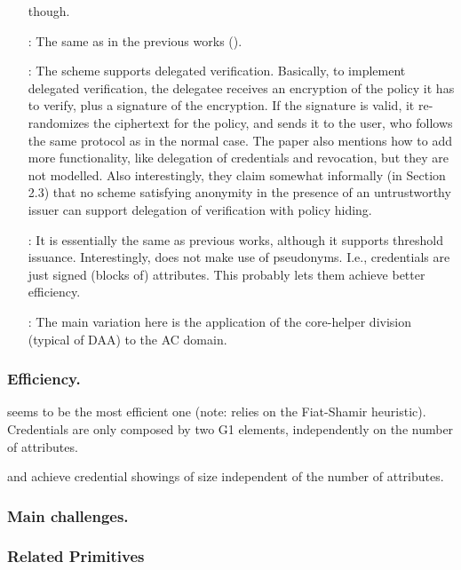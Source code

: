 \begin{enumerate}
  though.
\item[\cite{cdhk15}:] The same as in the previous works (\cite{cl01,cl02,cl04}).
\item[\cite{dmm+18}:] The scheme supports delegated verification. Basically,
  to implement delegated verification, the delegatee receives an encryption of
  the policy it has to verify, plus a signature of the encryption. If the
  signature is valid, it re-randomizes the ciphertext for the policy, and
  sends it to the user, who follows the same protocol as in the normal case.
  The paper also mentions how to add more functionality, like delegation of
  credentials and revocation, but they are not modelled. Also interestingly,
  they claim somewhat informally (in Section 2.3) that no scheme satisfying
  anonymity in the presence of an untrustworthy issuer can support delegation
  of verification with policy hiding.
\item[\cite{sms+19}:] It is essentially the same as previous works, although it
  supports threshold issuance. Interestingly, \cite{sms+19} does not make use
  of pseudonyms. I.e., credentials are just signed (blocks of) attributes. This
  probably lets them achieve better efficiency. 
\item[\cite{hs21}:] The main variation here is the application of the core-helper
  division (typical of DAA) to the AC domain.
\end{enumerate}

\subsubsection{Efficiency.}

\cite{sms+19} seems to be the most efficient one (note: relies on the
Fiat-Shamir heuristic). Credentials are only composed by two G1 elements,
independently on the number of attributes. 

\cite{cdhk15} and \cite{fhs19} achieve credential showings of size independent
of the number of attributes.

\subsubsection{Main challenges.}

\subsubsection{Related Primitives}

